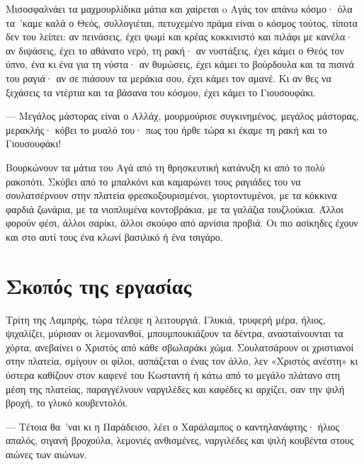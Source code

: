 \documentclass[diploma]{softlab-thesis}
\begin{document}
Μισοσφαλνάει τα μαχμουρλίδικα μάτια και χαίρεται o Αγάς τον απάνω κόσμο· όλα
τα~’καμε καλά ο Θεός, συλλογιέται, πετυχεμένο πράμα είναι ο κόσμος τούτος,
τίποτα δεν του λείπει: αν πεινάσεις, έχει ψωμί και κρέας κοκκινιστό και
πιλάφι με κανέλα· αν διψάσεις, έχει το αθάνατο νερό, τη ρακή· αν νυστάξεις,
έχει κάμει ο Θεός τον ύπνο, ένα κι ένα για τη νύστα· αν θυμώσεις, έχει κάμει
το βούρδουλα και τα πισινά του ραγιά· αν σε πιάσουν τα μεράκια σου, έχει
κάμει τον αμανέ. Κι αν θες να ξεχάσεις τα ντέρτια και τα βάσανα του κόσμου,
έχει κάμει το Γιουσουφάκι.

--- Μεγάλος μάστορας είναι ο Αλλάχ, μουρμούρισε συγκινημένος, μεγάλος
μάστορας, μερακλής· κόβει το μυαλό του· πως του ήρθε τώρα κι έκαμε τη ρακή
και το Γιουσουφάκι!

Βουρκώνουν τα μάτια του Αγά από τη θρησκευτική κατάνυξη κι από το πολύ
ρακοπότι. Σκύβει από το μπαλκόνι και καμαρώνει τους ραγιάδες του να
σουλατσέρνουν στην πλατεία φρεσκοξουρισμένοι, γιορτοντυμένοι, με τα κόκκινα
φαρδιά ζωνάρια, με τα νιοπλυμένα κοντοβράκια, με τα γαλάζια
τουζλούκια. Άλλοι φορούν φέσι, άλλοι σαρίκι, άλλοι σκούφο από αρνίσια
προβιά. Οι πιο ασίκηδες έχουν και στο αυτί τους ένα κλωνί βασιλικό ή ένα
τσιγάρο.


\section{Σκοπός της εργασίας}

Τρίτη της Λαμπρής, τώρα τέλεψε η λειτουργιά. Γλυκιά, τρυφερή μέρα, ήλιος,
ψιχαλίζει, μύρισαν οι λεμονανθοί, μπουμπουκιάζουν τα δέντρα, ανασταίνουνται
τα χόρτα, ανεβαίνει ο Χριστός από κάθε σβωλαράκι χώμα. Σουλατσάρουν οι
χριστιανοί στην πλατεία, σμίγουν οι φίλοι, ασπάζεται ο ένας τον άλλο, λεν
«Χριστός ανέστη» κι ύστερα καθίζουν στον καφενέ του Κωσταντή ή κάτω από το
μεγάλο πλάτανο στη μέση της πλατείας, παραγγέλνουν ναργιλέδες και καφέδες κι
αρχίζει, σαν την ψιλή βροχή, το γλυκό κουβεντολόι.

--- Τέτοια θα~’ναι κι η Παράδεισο, λέει ο Χαράλαμπος ο καντηλανάφτης· ήλιος
απαλός, σιγανή βροχούλα, λεμονιές ανθισμένες, ναργιλέδες και ψιλή κουβέντα
στους αιώνες των αιώνων.
\end{document}
